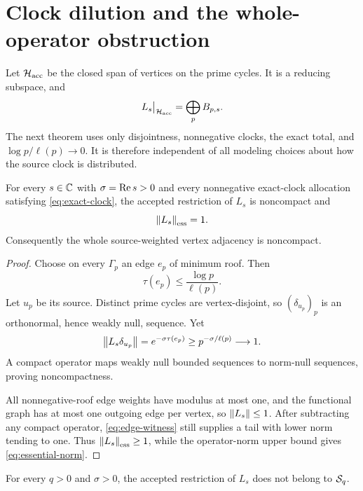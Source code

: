 \section{Clock dilution and the whole-operator obstruction}
\label{sec:dilution}

Let $\mathcal{H}_{\mathrm{acc}}$ be the closed span of vertices on the prime cycles.
It is a reducing subspace, and
\[
L_s\big|_{\mathcal{H}_{\mathrm{acc}}}=\bigoplus_p B_{p,s}.
\]
The next theorem uses only disjointness, nonnegative clocks, the exact total,
and
$\log p/\ell(p)\to0$.  It is therefore independent of all modeling choices
about how the source clock is distributed.

\begin{theorem}
\label{thm:noncompact}
For every $s\in\mathbb{C}$ with $\sigma=\operatorname{Re} s>0$ and every nonnegative exact-clock
allocation satisfying \eqref{eq:exact-clock}, the accepted restriction of
$L_s$ is noncompact and
\begin{equation}
\left\lVert L_s\right\rVert_{\mathrm{ess}}=1.
\label{eq:essential-norm}
\end{equation}
Consequently the whole source-weighted vertex adjacency is noncompact.
\end{theorem}

\begin{proof}
Choose on every $\Gamma_p$ an edge $e_p$ of minimum roof.  Then
\[
\tau(e_p)\le\frac{\log p}{\ell(p)}.
\]
Let $u_p$ be its source.  Distinct prime cycles are vertex-disjoint, so
$(\delta_{u_p})_p$ is an orthonormal, hence weakly null, sequence.  Yet
\begin{equation}
\left\lVert L_s\delta_{u_p}\right\rVert
=e^{-\sigma\tau(e_p)}
\ge p^{-\sigma/\ell(p)}\longrightarrow1.
\label{eq:edge-witness}
\end{equation}
A compact operator maps weakly null bounded sequences to norm-null
sequences, proving noncompactness.

All nonnegative-roof edge weights have modulus at most one, and the functional
graph has at most one outgoing edge per vertex, so $\left\lVert L_s\right\rVert\le1$.  After
subtracting any compact operator,
\eqref{eq:edge-witness} still supplies a tail with lower norm tending to one.
Thus $\left\lVert L_s\right\rVert_{\mathrm{ess}}\ge1$, while the operator-norm upper bound gives
\eqref{eq:essential-norm}.
\end{proof}

\begin{theorem}
\label{thm:no-schatten}
For every $q>0$ and $\sigma>0$, the accepted restriction of $L_s$ does not
belong to $\mathcal{S}_q$.
\end{theorem}

